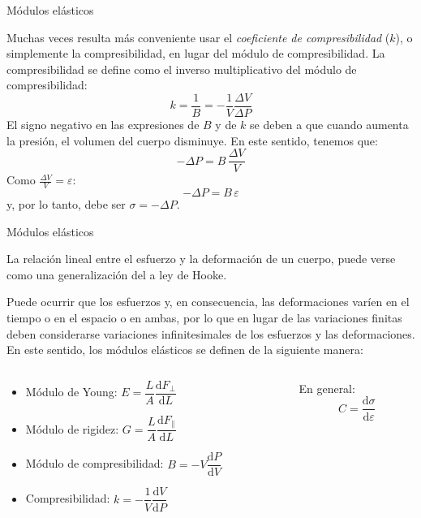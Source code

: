 \documentclass[11pt,handout,aspectratio=1610]{beamer}
\newcommand{\fdiff}[2]{\dfrac{\text{d} #1}{\text{d} #2}}
\newcommand{\vs}{\vspace{11pt}}
\begin{document}
\begin{frame}{Módulos elásticos}

    Muchas veces resulta más conveniente usar el \emph{coeficiente de compresibilidad} ($k$), o simplemente la compresibilidad, en lugar del módulo de compresibilidad. La compresibilidad se define como el inverso multiplicativo del módulo de compresibilidad: $$ k = \frac{1}{B} = - \frac{1}{V} \frac{\Delta V}{\Delta P} $$ El signo negativo en las expresiones de $B$ y de $k$ se deben a que cuando aumenta la presión, el volumen del cuerpo disminuye. En este sentido, tenemos que: $$ - \Delta P = B \, \frac{\Delta V}{V} $$ Como $\frac{\Delta V}{V} = \varepsilon $: $$ - \Delta P = B \, \varepsilon $$ y, por lo tanto, debe ser $\sigma = - \Delta P$.


\end{frame}

\begin{frame}{Módulos elásticos}

    La relación lineal entre el esfuerzo y la deformación de un cuerpo, puede verse como una generalización del a ley de Hooke.

    \vs

    Puede ocurrir que los esfuerzos y, en consecuencia, las deformaciones varíen en el tiempo o en el espacio o en ambas, por lo que en lugar de las variaciones finitas deben considerarse variaciones infinitesimales de los esfuerzos y las deformaciones. En este sentido, los módulos elásticos se definen de la siguiente manera:
    \begin{columns}
        \begin{column}{0.6\textwidth}
            \begin{itemize}
                \item Módulo de Young: $ E = \dfrac{L}{A} \fdiff{F_\perp}{L} $
                \item Módulo de rigidez: $ G = \dfrac{L}{A} \fdiff{F_\parallel}{L}$
                \item Módulo de compresibilidad: $ B = - V \fdiff{P}{V} $
                \item Compresibilidad: $ k =  - \dfrac{1}{V} \fdiff{V}{P} $
            \end{itemize}
        \end{column}
        \vrule
        \begin{column}{0.4\textwidth}
            \hspace{11pt} En general: $$ C = \fdiff{\sigma}{\varepsilon} $$
        \end{column}
    \end{columns}

\end{frame}
\end{document}
